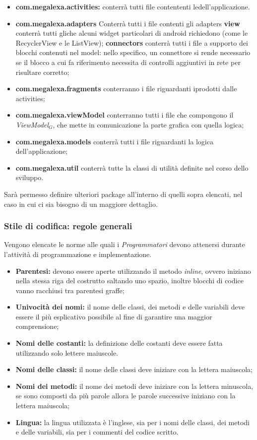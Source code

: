 \begin{itemize}
	\item  \textbf{com.megalexa.activities:} conterrà tutti file contententi ledell'applicazione.
	\item  \textbf{com.megalexa.adapters} Conterrà tutti i file contenti gli adapters
			\subitem \textbf{view} conterrà tutti gliche alcuni widget particolari di android richiedono (come le RecyclerView e le ListView);
			\subitem \textbf{connectors} conterrà tutti i file a supporto dei blocchi contenuti nel model: nello specifico, un connettore si rende necessario se il blocco a cui fa riferimento necessita di controlli aggiuntivi in rete per risultare corretto;
	\item  \textbf{com.megalexa.fragments} conterranno i file riguardanti iprodotti dalle activities;
	\item  \textbf{com.megalexa.viewModel}	conterranno tutti i file che compongono il \textit{ViewModel$_{G}$}, che mette in comunicazione la parte grafica con quella logica;	
	\item  \textbf{com.megalexa.models} conterrà tutti i file riguardanti la 
	logica dell'applicazione;
	\item  \textbf{com.megalexa.util} conterrà tutte la classi di utilità definite nel corso dello sviluppo.	

\end{itemize}
Sarà permesso definire ulteriori package all'interno di quelli sopra elencati, nel caso in cui ci sia bisogno di un maggiore dettaglio.

\subsubsection{Stile di codifica: regole generali} 
Vengono elencate le norme alle quali i \textit{Programmatori} devono attenersi durante l'attività di programmazione e implementazione.
\begin{itemize}
	\item \textbf{Parentesi:} devono essere aperte utilizzando il metodo \textit{inline}, ovvero iniziano nella stessa riga del costrutto saltando uno spazio, inoltre blocchi di codice vanno racchiusi tra parentesi graffe;
	\item \textbf{Univocità dei nomi:} il nome delle classi, dei metodi e delle variabili deve essere il più esplicativo possibile al fine di garantire una maggior comprensione;
	\item \textbf{Nomi delle costanti:} la definizione delle costanti deve essere fatta utilizzando solo lettere maiuscole.
	\item \textbf{Nomi delle classi:} il nome delle classi deve iniziare con la lettera maiuscola;
	\item \textbf{Nomi dei metodi:} il nome dei metodi deve iniziare con la lettera minuscola, se sono composti da più parole allora le parole successive iniziano con la lettera maiuscola;
	\item \textbf{Lingua:} la lingua utilizzata è l'inglese, sia per i nomi delle classi, dei metodi e delle variabili, sia per i commenti del codice scritto.
\end{itemize}

